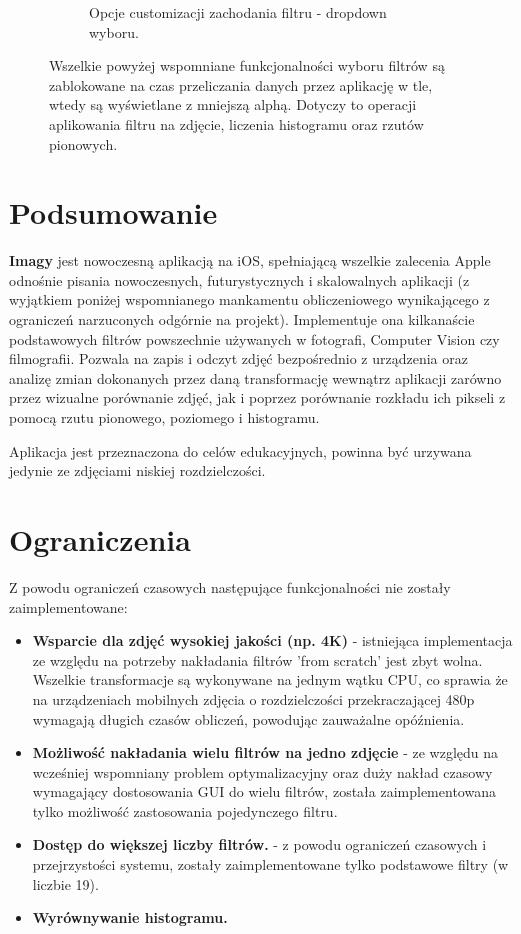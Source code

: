 \documentclass[a4paper]{article}
\begin{document}
\begin{figure}[H]
\begin{subfigure}{0.2\textwidth}
        \caption{Opcje customizacji zachodania filtru - dropdown wyboru.}
        \label{fig:filter_options_2}
    \end{subfigure}
    \caption{Wszelkie powyżej wspomniane funkcjonalności wyboru filtrów są zablokowane na czas przeliczania danych przez aplikację w tle, wtedy są wyświetlane z mniejszą alphą. Dotyczy to operacji aplikowania filtru na zdjęcie, liczenia histogramu oraz rzutów pionowych.}
    \label{fig:filter_screen}
\end{figure}

\section{Podsumowanie}

\textbf{Imagy} jest nowoczesną aplikacją na iOS, spełniającą wszelkie zalecenia Apple odnośnie pisania nowoczesnych, futurystycznych i skalowalnych aplikacji (z wyjątkiem poniżej wspomnianego mankamentu obliczeniowego wynikającego z ograniczeń narzuconych odgórnie na projekt). Implementuje ona kilkanaście podstawowych filtrów powszechnie używanych w fotografi, Computer Vision czy filmografii. Pozwala na zapis i odczyt zdjęć bezpośrednio z urządzenia oraz analizę zmian dokonanych przez daną transformację wewnątrz aplikacji zarówno przez wizualne porównanie zdjęć, jak i poprzez porównanie rozkładu ich pikseli z pomocą rzutu pionowego, poziomego i histogramu.

Aplikacja jest przeznaczona do celów edukacyjnych, powinna być urzywana jedynie ze zdjęciami niskiej rozdzielczości.

\section{Ograniczenia}

Z powodu ograniczeń czasowych następujące funkcjonalności nie zostały zaimplementowane:
\begin{itemize}
    \item \textbf{Wsparcie dla zdjęć wysokiej jakości (np. 4K)} - istniejąca implementacja ze względu na potrzeby nakładania filtrów 'from scratch' jest zbyt wolna. Wszelkie transformacje są wykonywane na jednym wątku CPU, co sprawia że na urządzeniach mobilnych zdjęcia o rozdzielczości przekraczającej 480p wymagają długich czasów obliczeń, powodując zauważalne opóźnienia.
    \item \textbf{Możliwość nakładania wielu filtrów na jedno zdjęcie} - ze względu na wcześniej wspomniany problem optymalizacyjny oraz duży nakład czasowy wymagający dostosowania GUI do wielu filtrów, została zaimplementowana tylko możliwość zastosowania pojedynczego filtru.
    \item \textbf{Dostęp do większej liczby filtrów.} - z powodu ograniczeń czasowych i przejrzystości systemu, zostały zaimplementowane tylko podstawowe filtry (w liczbie 19).
    \item \textbf{Wyrównywanie histogramu.}
\end{itemize}
\end{document}
